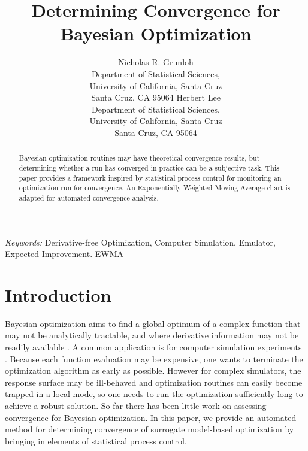 \documentclass{article}
\title{{\LARGE\bf Determining Convergence for Bayesian Optimization}}
\author{
Nicholas R. Grunloh\\
Department of Statistical Sciences,\\ University of California, Santa Cruz\\
Santa Cruz, CA 95064
\And
Herbert Lee\\
Department of Statistical Sciences,\\ University of California, Santa Cruz\\
Santa Cruz, CA 95064
}
\begin{document}
\def\spacingset#1{\renewcommand{\baselinestretch}%
{#1}\small\normalsize} \spacingset{1}

%
\maketitle

%
\begin{abstract}
\noindent 
Bayesian optimization routines may have theoretical convergence results, but 
determining whether a run has converged in practice can be a subjective task. 
This paper provides a framework inspired by statistical process control for 
monitoring an optimization run for convergence. An Exponentially Weighted 
Moving Average chart is adapted for automated convergence analysis.
\end{abstract}


\noindent
{\it Keywords:} Derivative-free Optimization, Computer Simulation, Emulator, Expected Improvement. EWMA


%
%
\section{Introduction}
%
%


Bayesian optimization aims to find a global optimum of a complex
function that may not be analytically tractable, and where derivative
information may not be readily available
\citep{mockus:1989,brochu:2010}. A common application is for computer
simulation experiments \cite{gramacy:2020}. Because each function
evaluation may be
expensive, one wants to terminate the optimization algorithm as early as possible. 
However for complex simulators, the response surface may be ill-behaved and optimization 
routines can easily become trapped in a local mode, so one needs to run the 
optimization sufficiently long to achieve a robust solution. So far
there has been little work on assessing convergence for Bayesian
optimization. In this paper, we provide an automated method for determining 
convergence of surrogate model-based optimization by bringing in 
elements of statistical process control.
\end{document}
